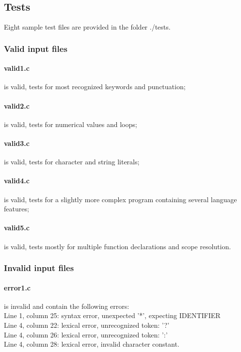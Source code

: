 
\subsection{Tests}
Eight sample test files are provided in the folder ./tests.

\subsubsection{Valid input files}
\paragraph{valid1.c} is valid, tests for most recognized keywords and punctuation;
\paragraph{valid2.c} is valid, tests for numerical values and loops;
\paragraph{valid3.c} is valid, tests for character and string literals;
\paragraph{valid4.c} is valid, tests for a slightly more complex program containing several language features;
\paragraph{valid5.c} is valid, tests mostly for multiple function declarations and scope resolution.

\subsubsection{Invalid input files}
\paragraph{error1.c} is invalid and contain the following errors: \\
Line 1, column 25: syntax error, unexpected '*', expecting IDENTIFIER \\
Line 4, column 22: lexical error, unrecognized token: '?' \\
Line 4, column 26: lexical error, unrecognized token: ':' \\
Line 4, column 28: lexical error, invalid character constant. \\

